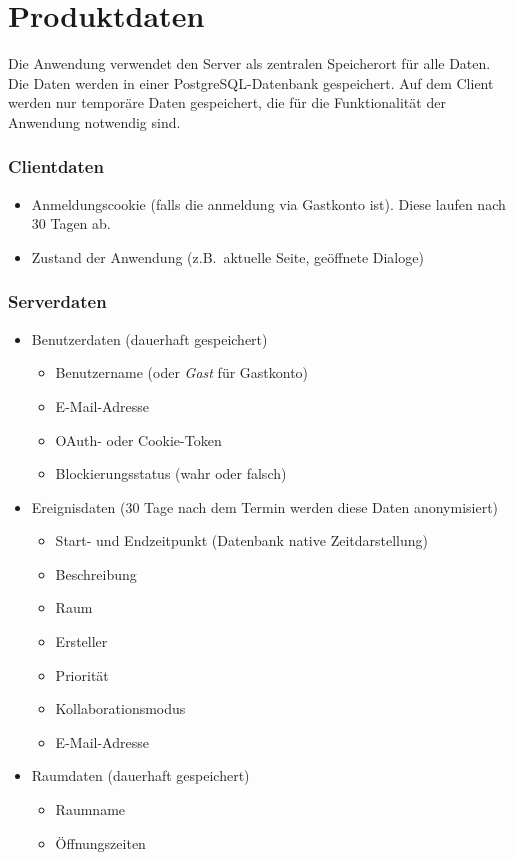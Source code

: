 
\chapter{Produktdaten}
\label{chap:product_data}

Die Anwendung verwendet den Server als zentralen Speicherort für alle Daten.
Die Daten werden in einer \gls{PostgreSQL}-Datenbank gespeichert.
Auf dem Client werden nur temporäre Daten gespeichert, die für die Funktionalität der Anwendung notwendig sind.


\subsection*{Clientdaten}
\begin{itemize}
    \item Anmeldungscookie (falls die anmeldung via Gastkonto ist).
          Diese laufen nach 30 Tagen ab.
    \item Zustand der Anwendung (z.B.\ aktuelle Seite, geöffnete Dialoge)
\end{itemize}

\subsection*{Serverdaten}
\begin{itemize}
    \item Benutzerdaten (dauerhaft gespeichert)
    \begin{itemize}
        \item Benutzername (oder \textit{Gast} für Gastkonto)
        \item E-Mail-Adresse
        \item OAuth- oder Cookie-Token
        \item Blockierungsstatus (wahr oder falsch)
    \end{itemize}
    \item Ereignisdaten (30 Tage nach dem Termin werden diese Daten anonymisiert)
    \begin{itemize}
        \item Start- und Endzeitpunkt (Datenbank native Zeitdarstellung)
        \item Beschreibung
        \item Raum
        \item Ersteller
        \item Priorität
        \item Kollaborationsmodus
        \item E-Mail-Adresse
    \end{itemize}
    \item Raumdaten (dauerhaft gespeichert)
    \begin{itemize}
        \item Raumname
        \item Öffnungszeiten
    \end{itemize}
\end{itemize}